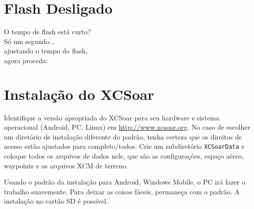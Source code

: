\documentclass[a4paper,12pt,utf8]{scrreprt}
\begin{document}
\section*{{\color[rgb]{.9,.85,0}Flash} Desligado}

\vspace{2em}
\hspace*{1cm} O tempo de flash está curto?\\
\hspace*{4cm} Só um segundo...\\
\hspace*{6cm} ajustando o tempo do flash,\\
\hspace*{10cm} agora proceda: 


\setlength{\parskip}{0.3\baselineskip}
\newpage
\section{Instalação do XCSoar }\label{ch:XCSinstall}


Identifique a versão apropriada do XCSoar para seu hardware e sistema operacional \textsf{(Android, PC, Linux)}
em \url{http://www.xcsoar.org}.
No caso de escolher um diretório de instalação diferente do padrão, tenha certeza que os direitos de acesso estão ajustados para completo/todos.  Crie um subdiretório \texttt{XCSoarData} e coloque todos os arquivos de dados nele, que são as configurações, espaço aéreo, waypoints e os arquivos XCM de terreno.

Usando o padrão da instalação para Android, Windows Mobile, o PC irá fazer o trabalho suavemente.  Para deixar as coisas fáceis, permaneça com o padrão.  A instalação no cartão SD é possível.
\end{document}
